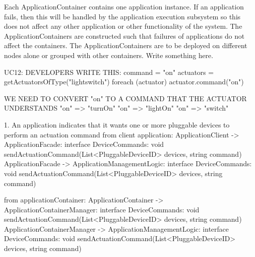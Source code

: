         Each ApplicationContainer contains one application instance. If an application fails,
        then this will be handled by the application execution subsystem so this
        does not affect any other application or other functionality of the system.
        The ApplicationContainers are constructed such that failures of applications
        do not affect the containers. The ApplicationContainers are to be deployed
        on different nodes alone or grouped with other containers. Write something here.




        UC12:
            DEVELOPERS WRITE THIS: command = "on"
            actuators = getActuatorsOfType("lightswitch")
            foreach (actuator) {
                actuator.command("on")
            }

            WE NEED TO CONVERT "on" TO A COMMAND THAT THE ACTUATOR UNDERSTANDS
            "on" => "turnOn"
            "on" => "lightOn"
            "on" => "switch"

            1. An application indicates that it wants one or more pluggable devices to perform an actuation command
                from client application:
                    ApplicationClient -> ApplicationFacade:           interface DeviceCommands: void sendActuationCommand(List<PluggableDeviceID> devices, string command)
                    ApplicationFacade -> ApplicationManagementLogic: interface DeviceCommands:  void sendActuationCommand(List<PluggableDeviceID> devices, string command)

                from applicationContainer:
                    ApplicationContainer -> ApplicationContainerManager: interface DeviceCommands: void sendActuationCommand(List<PluggableDeviceID> devices, string command)
                    ApplicationContainerManager -> ApplicationManagementLogic: interface DeviceCommands: void sendActuationCommand(List<PluggableDeviceID> devices, string command)

